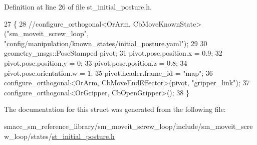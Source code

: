 Definition at line 26 of file st\+\_\+initial\+\_\+posture.\+h.


\begin{DoxyCode}
27         \{
28             \textcolor{comment}{//configure\_orthogonal<OrArm, CbMoveKnownState>("sm\_moveit\_screw\_loop",
       "config/manipulation/known\_states/initial\_posture.yaml");}
29 
30             geometry\_msgs::PoseStamped pivot;
31             pivot.pose.position.x = 0.9;
32             pivot.pose.position.y = 0;
33             pivot.pose.position.z = 0.8;
34             pivot.pose.orientation.w = 1;
35             pivot.header.frame\_id = \textcolor{stringliteral}{"map"};
36             configure\_orthogonal<OrArm, CbMoveEndEffector>(pivot, \textcolor{stringliteral}{"gripper\_link"});
37             configure\_orthogonal<OrGripper, CbOpenGripper>();
38         \}
\end{DoxyCode}


The documentation for this struct was generated from the following file\+:\begin{DoxyCompactItemize}
\item 
smacc\+\_\+sm\+\_\+reference\+\_\+library/sm\+\_\+moveit\+\_\+screw\+\_\+loop/include/sm\+\_\+moveit\+\_\+screw\+\_\+loop/states/\hyperlink{sm__moveit__screw__loop_2include_2sm__moveit__screw__loop_2states_2st__initial__posture_8h}{st\+\_\+initial\+\_\+posture.\+h}\end{DoxyCompactItemize}
